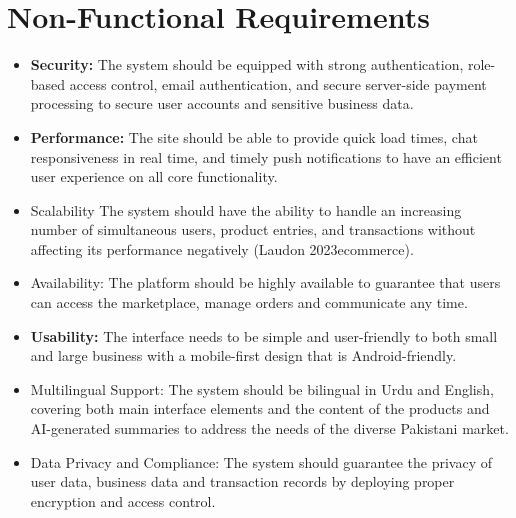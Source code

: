 \section{Non-Functional Requirements}
\begin{itemize}
    \item \textbf{Security:} The system should be equipped with strong authentication, role-based access control, email authentication, and secure server-side payment processing to secure user accounts and sensitive business data.
    
    \item \textbf{Performance:} The site should be able to provide quick load times, chat responsiveness in real time, and timely push notifications to have an efficient user experience on all core functionality.
    
    \item Scalability The system should have the ability to handle an increasing number of simultaneous users, product entries, and transactions without affecting its performance negatively (Laudon 2023ecommerce).
    
    \item Availability: The platform should be highly available to guarantee that users can access the marketplace, manage orders and communicate any time.
    
    \item \textbf{Usability:} The interface needs to be simple and user-friendly to both small and large business with a mobile-first design that is Android-friendly.
    
    \item Multilingual Support: The system should be bilingual in Urdu and English, covering both main interface elements and the content of the products and AI-generated summaries to address the needs of the diverse Pakistani market.
    
    \item Data Privacy and Compliance: The system should guarantee the privacy of user data, business data and transaction records by deploying proper encryption and access control.
\end{itemize}

